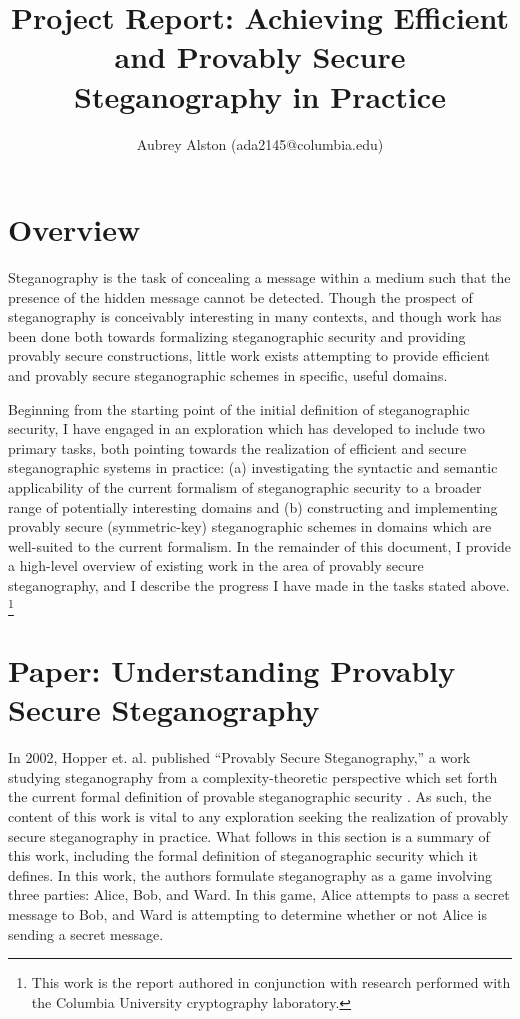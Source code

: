 \documentclass{article}
\title{Project Report: Achieving Efficient and Provably Secure Steganography in Practice}
\author{Aubrey Alston (ada2145@columbia.edu)}
\date{}
\begin{document}
\maketitle

\section{Overview}

Steganography is the task of concealing a message within a medium such that the presence of the 
hidden message cannot be detected.  Though the prospect of steganography is conceivably interesting 
in many contexts, and though work has been done both towards formalizing steganographic security and 
providing provably secure constructions, little work exists attempting to provide efficient and provably 
secure steganographic schemes in specific, useful domains.  

Beginning from the starting point of the initial definition of steganographic security, I have 
engaged in an exploration which has developed to include two primary tasks, both pointing towards 
the realization of efficient and secure steganographic systems in practice: (a) investigating the 
syntactic and semantic applicability of the current formalism of steganographic security 
to a broader range of potentially interesting domains and (b) constructing and implementing provably 
secure (symmetric-key) steganographic schemes in domains which are well-suited to the current formalism.
\newline\newline
\noindent In the remainder of this document, I provide a high-level overview of existing work in the 
area of provably secure steganography, and I describe the progress I have made in the tasks stated above.
\footnote{This work is the report authored in conjunction with research performed with the Columbia University
cryptography laboratory.}

\tableofcontents

\section{Paper: Understanding Provably Secure Steganography}

In 2002, Hopper et. al. published ``Provably Secure Steganography,'' a work studying steganography 
from a complexity-theoretic perspective which set forth the current formal definition of provable 
steganographic security \cite{BiglouPSS}.  As such, the content of this work is vital to any 
exploration seeking the realization of provably secure steganography in practice.  What follows in this 
section is a summary of this work, including the formal definition of steganographic security which it defines.
\newline\newline
In this work, the authors formulate steganography as a game involving three parties: Alice, Bob, and Ward.
In this game, Alice attempts to pass a secret message to Bob, and Ward is attempting to determine whether 
or not Alice is sending a secret message.
\end{document}
